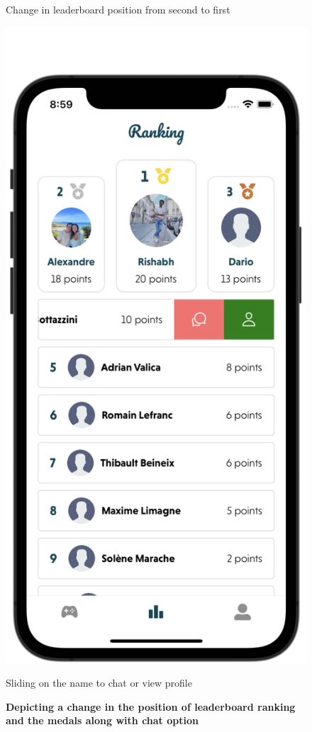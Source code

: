\begin{figure}[H]
\begin{minipage}[b]{0.3\linewidth}
        \caption{Change in leaderboard position from second to first}
    \end{minipage}
    \hspace{0.02\linewidth}
    \begin{minipage}[b]{0.3\linewidth}
        \centering
        \includegraphics[width=\linewidth]{leaderboard chat.png}
        \caption{Sliding on the name to chat or view profile}
    \end{minipage}
    \vspace{0.5cm}
    \caption{\textbf{Depicting a change in the position of leaderboard ranking and the medals along with chat option}}
\end{figure}



